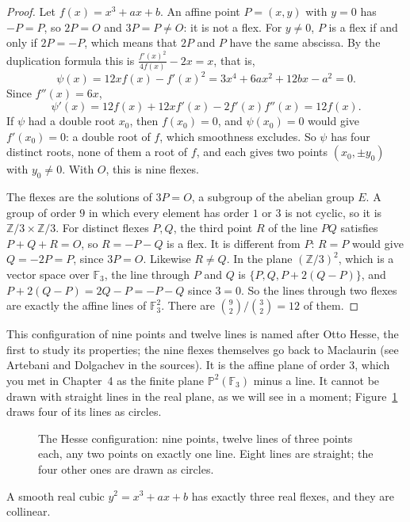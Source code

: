 \begin{proof}
Let $f(x)=x^3+ax+b$. An affine point $P=(x,y)$ with $y=0$ has $-P=P$, so $2P=O$ and $3P=P\ne O$: it is not a flex. For $y\ne0$, $P$ is a flex if and only if
$2P=-P$, which means that $2P$ and $P$ have the same abscissa. By the duplication formula this is $\frac{f'(x)^2}{4f(x)}-2x=x$, that is,
\[
\psi(x)=12xf(x)-f'(x)^2=3x^4+6ax^2+12bx-a^2=0.
\]
Since $f''(x)=6x$,
\[
\psi'(x)=12f(x)+12xf'(x)-2f'(x)f''(x)=12f(x).
\] If $\psi$ had a double root $x_0$, then $f(x_0)=0$, and $\psi(x_0)=0$ would give
$f'(x_0)=0$: a double root of $f$, which smoothness excludes. So $\psi$ has four distinct roots, none of them a root of $f$, and each gives two points
$(x_0,\pm y_0)$ with $y_0\ne0$. With $O$, this is nine flexes.

The flexes are the solutions of $3P=O$, a subgroup of the abelian group $E$. A group of order $9$ in which every element has order $1$ or $3$ is not cyclic,
so it is $\mathbb Z/3\times\mathbb Z/3$. For distinct flexes $P,Q$, the third point $R$ of the line $PQ$ satisfies $P+Q+R=O$, so $R=-P-Q$ is a flex. It is
different from $P$: $R=P$ would give $Q=-2P=P$, since $3P=O$. Likewise $R\ne Q$. In the plane $(\mathbb Z/3)^2$, which is a vector space over $\mathbb F_3$,
the line through $P$ and $Q$ is $\{P,Q,P+2(Q-P)\}$, and $P+2(Q-P)=2Q-P=-P-Q$ since $3=0$. So the lines through two flexes are exactly the affine lines of
$\mathbb F_3^2$. There are $\binom92/\binom32=12$ of them.
\end{proof}

This configuration of nine points and twelve lines is named after Otto Hesse, the first to study its properties; the nine flexes themselves go back to
Maclaurin (see Artebani and Dolgachev in the sources). It is the affine plane of order $3$, which you met in Chapter~4 as the finite plane $\mathbb P^2(\mathbb F_3)$
minus a line. It cannot be drawn with straight lines in the real plane, as we will see in a moment; Figure~\ref{fig:hesse} draws four of its lines as circles.

\begin{figure}[ht]
\centering
{}
\caption{The Hesse configuration: nine points, twelve lines of three points each, any two points on exactly one line. Eight lines are straight; the four
other ones are drawn as circles.}
\label{fig:hesse}
\end{figure}

\begin{theorem}\label{thm:realflexes}
A smooth real cubic $y^2=x^3+ax+b$ has exactly three real flexes, and they are collinear.
\end{theorem}

